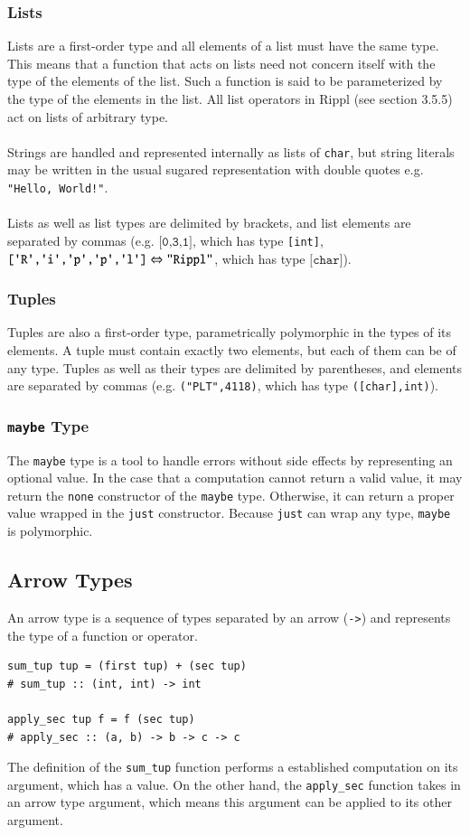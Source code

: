 \documentclass[5pt]{article}
\newcommand{\sq}{\textquotesingle}
\begin{document}
\subsubsection{Lists}
Lists are a first-order type and all elements of a list must have the same type. This means that a function that acts on lists need not concern itself with the type of the elements of the list. Such a function is said to be parameterized by the type of the elements in the list. All list operators in Rippl (see section 3.5.5) act on lists of arbitrary type. \\\\
Strings are handled and represented internally as lists of \texttt{char}, but
string literals may be written in the usual sugared representation with double quotes e.g. \texttt{"Hello, World!"}.\\\\
Lists as well as list types are delimited by brackets, and list elements are separated by commas (e.g. $\texttt{[0,3,1]}$, which has type \texttt{[int]}, $\texttt{[\sq R\sq,\sq i\sq,\sq p\sq,\sq p\sq,\sq l\sq]}\Leftrightarrow \texttt{"Rippl"}$, which has type $\texttt{[char]}$).

\subsubsection{Tuples}
Tuples are also a first-order type, parametrically polymorphic in the types of its elements. A tuple must contain exactly two elements, but each of them can be of any type. Tuples as well as their types are delimited by parentheses, and elements are separated by commas (e.g. \texttt{("PLT",4118)}, which has type \texttt{([char],int)}).

\subsubsection{\texttt{maybe} Type}
The \texttt{maybe} type is a tool to handle errors without side effects by representing an optional value. In the case that a computation cannot return a valid value, it may return the \texttt{none} constructor of the \texttt{maybe} type. Otherwise, it can return a proper value wrapped in the \texttt{just} constructor. Because \texttt{just} can wrap any type, \texttt{maybe} is polymorphic.

\subsection{Arrow Types}
An arrow type is a sequence of types separated by an arrow (\texttt{->}) and represents the type of a function or operator. %
\begin{lstlisting}[language=rippl]
sum_tup tup = (first tup) + (sec tup)
# sum_tup :: (int, int) -> int

apply_sec tup f = f (sec tup)
# apply_sec :: (a, b) -> b -> c -> c
\end{lstlisting}
The definition of the \texttt{sum\_tup} function performs a established computation on its argument, which has a value. On the other hand, the \texttt{apply\_sec} function takes in an arrow type argument, which means this argument can be applied to its other argument.
\end{document}
